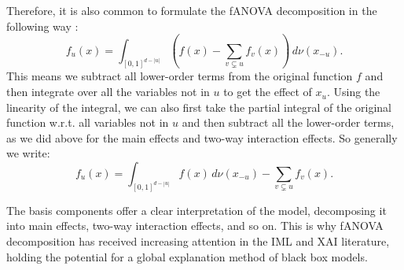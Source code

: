 Therefore, it is also common to formulate the fANOVA decomposition in the following way \citep{hooker2007,hooker2004}:
\begin{equation}
    f_u(x) = \int_{[0,1]^{d - |u|}} \left( f(x) - \sum_{v \subsetneq u} f_v(x) \right) \, d\nu(x_{-u}).
\end{equation}
This means we subtract all lower-order terms from the original function $f$ and then integrate over all the variables not in $u$ to get the effect of $x_u$. Using the linearity of the integral, we can also first take the partial integral of the original function w.r.t. all variables not in $u$ and then subtract all the lower-order terms, as we did above for the main effects and two-way interaction effects. So generally we write:
\begin{equation}
    f_u(x) = \int_{[0,1]^{d - |u|}} f(x) \, d\nu(x_{-u}) - \sum_{v \subsetneq u} f_v(x).
\end{equation}

The basis components offer a clear interpretation of the model, decomposing it into main effects, two-way interaction effects, and so on. This is why fANOVA decomposition has received increasing attention in the IML and XAI literature, holding the potential for a global explanation method of black box models.\par

